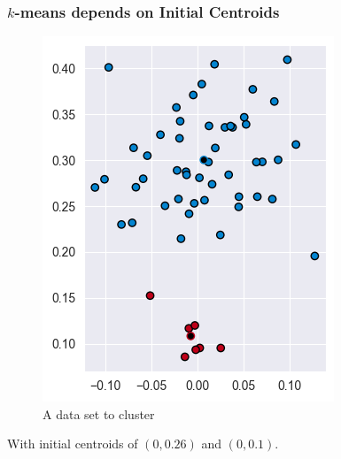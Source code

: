 \documentclass[smaller]{beamer}
\theoremstyle{example}
\begin{document}
\begin{frame}
    \frametitle{$k$-means depends on Initial Centroids}
    
    \begin{figure}
        \begin{center}
            \includegraphics[height=0.5\textheight]{../../Images/kmeans_balldata2.png}
        \end{center}
        \caption{A data set to cluster}
    \end{figure}
With initial centroids of $(0,0.26)$ and $(0, 0.1)$.
\vfill
\end{frame}
\end{document}
